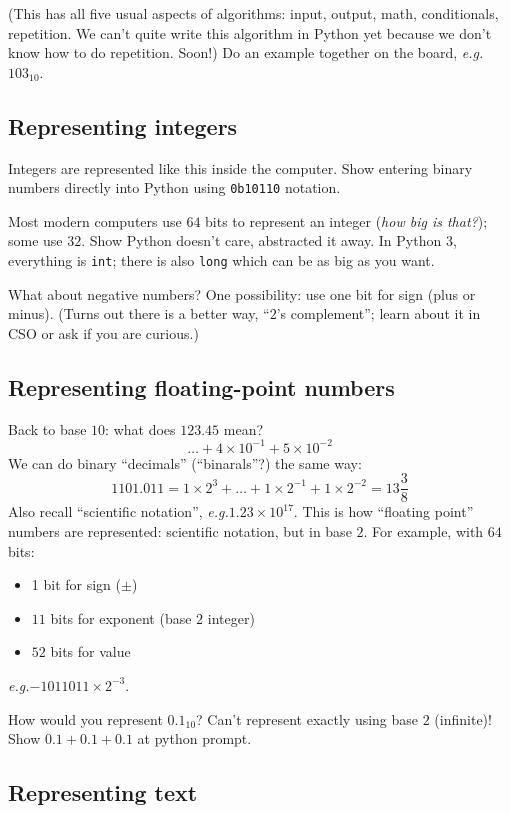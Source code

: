 \documentclass{article}
\newcommand{\eg}{\emph{e.g.}\xspace}
\begin{document}
(This has all five usual aspects of algorithms: input, output, math,
conditionals, repetition.  We can't quite write this algorithm in
Python yet because we don't know how to do repetition.  Soon!)  Do an
example together on the board, \eg $103_{10}$.

\subsection*{Representing integers}

Integers are represented like this inside the computer.  Show entering
binary numbers directly into Python using \verb|0b10110| notation.

Most modern computers use $64$ bits to represent an integer (\emph{how
  big is that?}); some use $32$. Show Python doesn't care, abstracted
it away.  In Python 3, everything is \texttt{int}; there is also
\texttt{long} which can be as big as you want.

What about negative numbers?  One possibility: use one bit for sign
(plus or minus).  (Turns out there is a better way, ``$2$'s
complement''; learn about it in CSO or ask if you are curious.)

\subsection*{Representing floating-point numbers}

Back to base $10$: what does $123.45$ mean?
\[ \dots + 4 \times 10^{-1} + 5 \times 10^{-2} \]
We can do binary ``decimals'' (``binarals''?) the same way: \[
1101.011 = 1 \times 2^3 + \dots + 1 \times 2^{-1} + 1 \times 2^{-2} =
13 \frac{3}{8} \]  Also recall ``scientific notation'', \eg $1.23
\times 10^{17}$.  This is how ``floating point'' numbers are
represented: scientific notation, but in base $2$.  For example, with
$64$ bits:
\begin{itemize}
\item 1 bit for sign ($\pm$)
\item $11$ bits for exponent (base $2$ integer)
\item $52$ bits for value
\end{itemize}
\eg $-1011011 \times 2^{-3}$.

How would you represent $0.1_{10}$?  Can't represent exactly using
base $2$ (infinite)! Show $0.1 + 0.1 + 0.1$ at python prompt.

\subsection*{Representing text}
\end{document}
